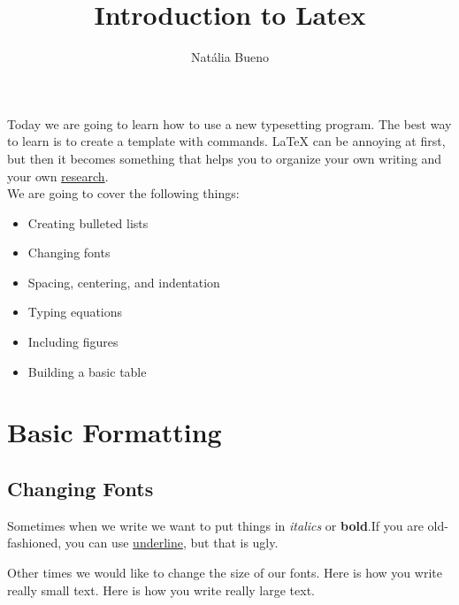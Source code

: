 \documentclass[11pt]{article} %
\title{Introduction to Latex}
\author{Nat\'alia Bueno}
\begin{document}
\maketitle %


\tableofcontents %

\newpage %
\noindent Today we are going to learn how to use a new typesetting program. The best way to learn is to create a template with commands. \LaTeX{} can be annoying at first, but then it becomes something that helps you to organize your own writing and your own \href{http://whatshouldwecallgradschool.tumblr.com/post/56277597781/why-i-do-research}{research}.
\\

We are going to cover the following things: 

\begin{itemize}
\item Creating bulleted lists
\item Changing fonts
\item Spacing, centering, and indentation
\item Typing equations
\item Including figures
\item Building a basic table
\end{itemize}

\vspace{4mm}
\section{Basic Formatting}

\vspace{4mm}
\subsection{Changing Fonts}

Sometimes when we write we want to put things in \emph{italics} or {\bf bold}.If you are old-fashioned, you can use \underline{underline}, but that is ugly. %






Other times we would like to change the size                    of our fonts. Here is how you write {\tiny really small text.} Here is how you write {\huge really large text}.
\end{document}
